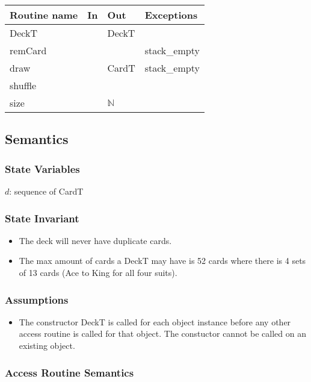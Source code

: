 \documentclass[12pt]{article}
\begin{document}
\begin{tabular}{| l | l | l | l |}
    \hline
    \textbf{Routine name} & \textbf{In} & \textbf{Out} & \textbf{Exceptions}\\
    \hline
    DeckT & ~ & DeckT & ~\\
    \hline
    remCard & ~ & ~ & stack\_empty\\
    \hline
    draw & ~ & CardT & stack\_empty\\
    \hline
    shuffle & ~ & ~ & ~\\
    \hline
    size & & $\mathbb{N}$ & ~\\
    \hline
\end{tabular}

\subsection* {Semantics}

\subsubsection* {State Variables}

$d$: sequence of CardT

\subsubsection* {State Invariant}

\begin{itemize}
  \item The deck will never have duplicate cards.
  \item The max amount of cards a DeckT may have is 52 cards where
  there is 4 sets of 13 cards (Ace to King for all four suits).
\end{itemize}

\subsubsection* {Assumptions}

\begin{itemize}
    \item The constructor DeckT is called for each object instance before
    any other access routine is called for that object. The constuctor
    cannot be called on an existing object.
\end{itemize}

\subsubsection* {Access Routine Semantics}
\end{document}
